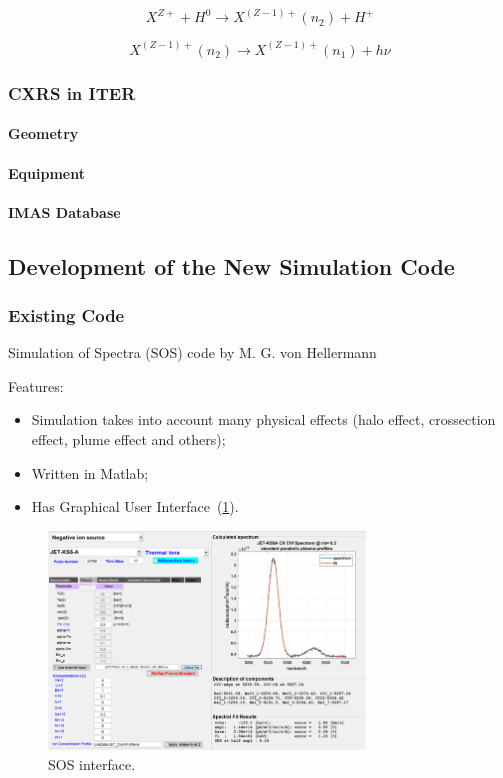 \documentclass[../main.tex]{subfiles}
\begin{document}
\begin{equation}
    \label{eq:main_reaction_first}
    X^{Z+} + H^0 \to X^{(Z-1)+}(n_2) + H^+
\end{equation}

\begin{equation}
    \label{eq:main_reaction_second}
    X^{(Z-1)+}(n_2) \to X^{(Z-1)+}(n_1) + h\nu
\end{equation}

\subsubsection{CXRS in ITER}
\paragraph{Geometry}
\paragraph{Equipment}
\paragraph{IMAS Database}

\subsection{Development of the New Simulation Code}
\subsubsection{Existing Code}
Simulation of Spectra (SOS) code by M. G. von Hellermann~\cite{sos}

Features:
\begin{itemize}
    \item Simulation takes into account many physical effects (halo effect, crossection effect, plume effect and others);
    \item Written in Matlab;
    \item Has Graphical User Interface~(\cref{fig:sos_interface}).
\end{itemize}

\begin{figure}[ht]
    \centering
    \includegraphics[width=0.75\textwidth]{images/sos_interface}
    \caption{SOS interface.}%
    \label{fig:sos_interface}
\end{figure}
\end{document}
